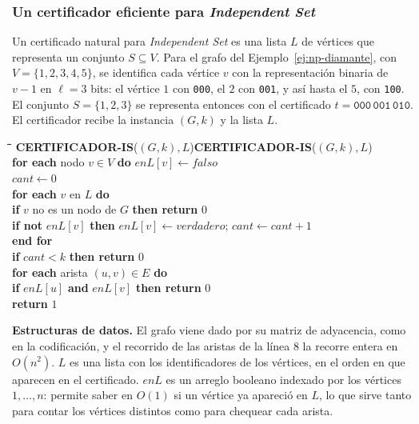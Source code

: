 \documentclass[12pt, spanish, oneside, openany]{book}
\newcommand{\prob}[1]{\textit{#1}}
\newcommand{\IS}{\prob{Independent Set}\xspace}
\newcommand{\pl}[1]{\makebox[1.6em][r]{\texttt{\footnotesize #1}}\hspace{0.9em}}
\newenvironment{pseudo}[1]{%
  \begin{center}%
  \begin{mdframed}[style=pseudobox]%
  \small
  \begin{tabbing}%
  \hspace{2.5em}\=\hspace{1.5em}\=\hspace{1.5em}\=\hspace{1.5em}\=\hspace{1.5em}\=\kill
  \def\pseudotitulo{#1}\ifx\pseudotitulo\empty\else#1\\[3pt]\fi}%
  {\end{tabbing}\end{mdframed}\end{center}}
\newenvironment{estructuras}%
  {\begin{center}\begin{minipage}{0.93\textwidth}\begin{mdframed}[style=estrbox]%
   \small\textbf{Estructuras de datos.}\;}%
  {\end{mdframed}\end{minipage}\end{center}}
\theoremstyle{uprightplain}
\theoremstyle{definition}
\theoremstyle{remark}
\theoremstyle{definition}
\begin{document}
\subsubsection{\texorpdfstring{Un certificador eficiente para \prob{Independent Set}}{Un certificador eficiente para Independent Set}}

Un certificado natural para \IS es una lista $L$ de vértices que representa un conjunto $S\subseteq V$. Para el grafo del Ejemplo~\ref{ej:np-diamante}, con $V=\{1,2,3,4,5\}$, se identifica cada vértice $v$ con la representación binaria de $v-1$ en $\ell=3$ bits: el vértice $1$ con \texttt{000}, el $2$ con \texttt{001}, y así hasta el $5$, con \texttt{100}. El conjunto $S=\{1,2,3\}$ se representa entonces con el certificado $t=\texttt{000}\,\texttt{001}\,\texttt{010}$. El certificador recibe la instancia $(G,k)$ y la lista $L$.

\begin{pseudo}{\textbf{CERTIFICADOR-IS}($(G,k),L$)}
\pl{1}\> \textbf{for each} nodo $v\in V$ \textbf{do} $\mathit{enL}[v]\leftarrow\mathit{falso}$\\
\pl{2}\> $\mathit{cant}\leftarrow 0$\\
\pl{3}\> \textbf{for each} $v$ en $L$ \textbf{do}\\
\pl{4}\>\> \textbf{if} $v$ no es un nodo de $G$ \textbf{then return} $0$\\
\pl{5}\>\> \textbf{if not} $\mathit{enL}[v]$ \textbf{then} $\mathit{enL}[v]\leftarrow\mathit{verdadero}$; $\mathit{cant}\leftarrow\mathit{cant}+1$\\
\pl{6}\> \textbf{end for}\\
\pl{7}\> \textbf{if} $\mathit{cant}<k$ \textbf{then return} $0$\\
\pl{8}\> \textbf{for each} arista $(u,v)\in E$ \textbf{do}\\
\pl{9}\>\> \textbf{if} $\mathit{enL}[u]$ \textbf{and} $\mathit{enL}[v]$ \textbf{then return} $0$\\
\pl{10}\> \textbf{return} $1$
\end{pseudo}

\begin{estructuras}
El grafo viene dado por su matriz de adyacencia, como en la codificación, y el
recorrido de las aristas de la línea $8$ la recorre entera en $O(n^2)$. $L$ es
una lista con los identificadores de los vértices, en el orden en que aparecen
en el certificado. $\mathit{enL}$ es un arreglo booleano indexado por los
vértices $1,\dots,n$: permite saber en $O(1)$ si un vértice ya apareció en $L$,
lo que sirve tanto para contar los vértices distintos como para chequear cada
arista.
\end{estructuras}
\end{document}
